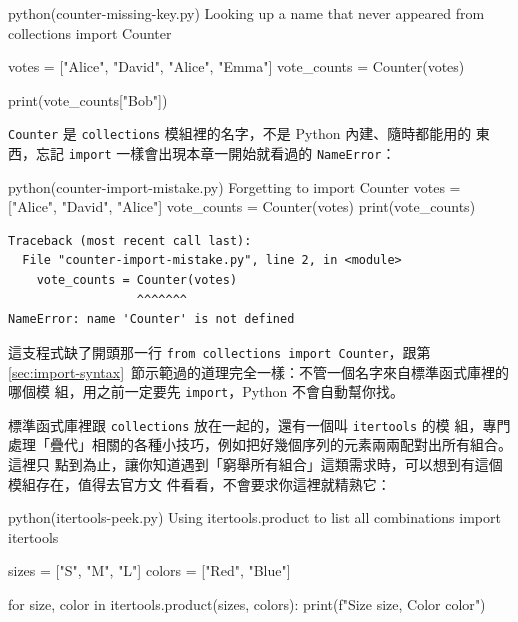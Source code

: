 \begin{example}{python}{(counter-missing-key.py) Looking up a name that never appeared}
from collections import Counter

votes = ["Alice", "David", "Alice", "Emma"]
vote_counts = Counter(votes)

print(vote_counts["Bob"])
\end{example}


\texttt{Counter} 是 \texttt{collections} 模組裡的名字，不是 Python 內建、隨時都能用的
東西，忘記 \texttt{import} 一樣會出現本章一開始就看過的 \texttt{NameError}：

\begin{example}{python}{(counter-import-mistake.py) Forgetting to import Counter}
votes = ["Alice", "David", "Alice"]
vote_counts = Counter(votes)
print(vote_counts)
\end{example}

\begin{verbatim}
Traceback (most recent call last):
  File "counter-import-mistake.py", line 2, in <module>
    vote_counts = Counter(votes)
                  ^^^^^^^
NameError: name 'Counter' is not defined
\end{verbatim}

這支程式缺了開頭那一行 \texttt{from collections import Counter}，跟第~
\ref{sec:import-syntax}~節示範過的道理完全一樣：不管一個名字來自標準函式庫裡的哪個模
組，用之前一定要先 \texttt{import}，Python 不會自動幫你找。

標準函式庫裡跟 \texttt{collections} 放在一起的，還有一個叫 \texttt{itertools} 的模
組，專門處理「疊代」相關的各種小技巧，例如把好幾個序列的元素兩兩配對出所有組合。這裡只
點到為止，讓你知道遇到「窮舉所有組合」這類需求時，可以想到有這個模組存在，值得去官方文
件看看，不會要求你這裡就精熟它：

\begin{example}{python}{(itertools-peek.py) Using itertools.product to list all combinations}
import itertools

sizes = ["S", "M", "L"]
colors = ["Red", "Blue"]

for size, color in itertools.product(sizes, colors):
    print(f"Size {size}, Color {color}")
\end{example}


